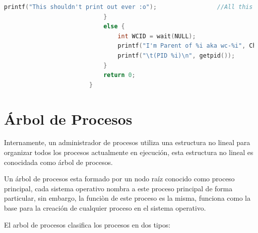 \documentclass[12pt, fleqn]{report}                             %
\begin{document}
\begin{lstlisting}[language=C, gobble=24]
                                printf("This shouldn't print out ever :o");                 //All this code stop existing
                            }
                            else {                                                          // ==== YOU ARE THE PARENT ====
                                int WCID = wait(NULL);                                      //This return the pid of the child
                                printf("I'm Parent of %i aka wc-%i", ChildID, WCID);        //Show me your ID then old man
                                printf("\t(PID %i)\n", getpid());                           //Show me your ID then old man
                            }
                            return 0;
                        }

                    \end{lstlisting}



        \clearpage
        \section{Árbol de Procesos}

            Internamente, un administrador de procesos utiliza una estructura no lineal para organizar todos
            los procesos actualmente en ejecución, esta estructura no lineal es conocidada como árbol de procesos.

            Un árbol de procesos esta formado por un nodo raíz conocido como proceso principal, cada sistema
            operativo nombra a este proceso principal de forma particular, sin embargo, la funciòn de este proceso
            es la misma, funciona como la base para la creación de cualquier proceso en el sistema operativo.

            El arbol de procesos clasifica los procesos en dos tipos:
\end{document}

